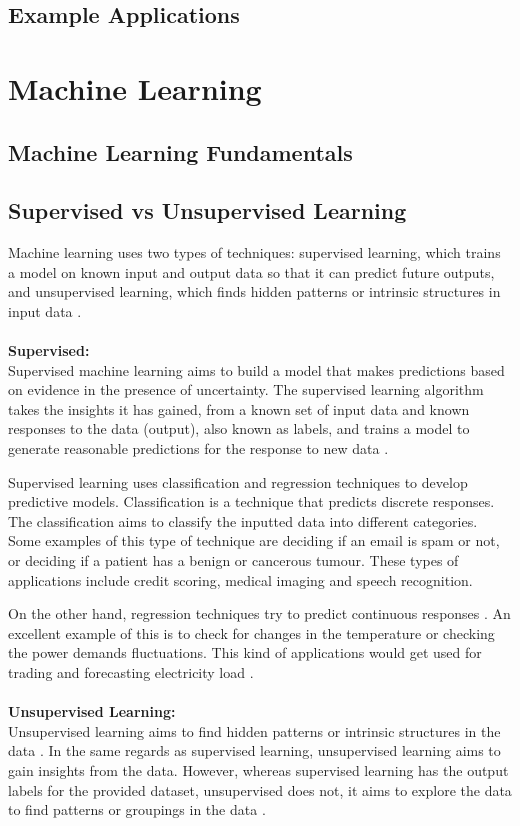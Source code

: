 	
	\subsection{Example Applications}
	

	\section{Machine Learning}
	
	\subsection{Machine Learning Fundamentals}
	
	
	\subsection{Supervised vs Unsupervised Learning}
	Machine learning uses two types of techniques: supervised learning, which trains a model on known input and output data so that it can predict future outputs, and unsupervised learning, which finds hidden patterns or intrinsic structures in input data \cite{geron2019hands}. \\
	\\
	\textbf{Supervised:} \\
	Supervised machine learning aims to build a model that makes predictions based on evidence in the presence of uncertainty. The supervised learning algorithm takes the insights it has gained, from a known set of input data and known responses to the data (output), also known as labels, and trains a model to generate reasonable predictions for the response to new data \cite{matlanintrotoml, geron2019hands}. 
	
	Supervised learning uses classification and regression techniques to develop predictive models. Classification is a technique that predicts discrete responses. The classification aims to classify the inputted data into different categories\cite{matlanintrotoml}. Some examples of this type of technique are deciding if an email is spam or not, or deciding if a patient has a benign or cancerous tumour. These types of applications include credit scoring, medical imaging and speech recognition.
	
	On the other hand, regression techniques try to predict continuous responses \cite{geron2019hands}. An excellent example of this is to check for changes in the temperature or checking the power demands fluctuations. This kind of applications would get used for trading and forecasting electricity load \cite{matlanintrotoml}. \\
	\\
	\textbf{Unsupervised Learning:} \\
	Unsupervised learning aims to find hidden patterns or intrinsic structures in the data \cite{geron2019hands}. In the same regards as supervised learning, unsupervised learning aims to gain insights from the data. However, whereas supervised learning has the output labels for the provided dataset, unsupervised does not, it aims to explore the data to find patterns or groupings in the data \cite{matlanintrotoml}.
	
